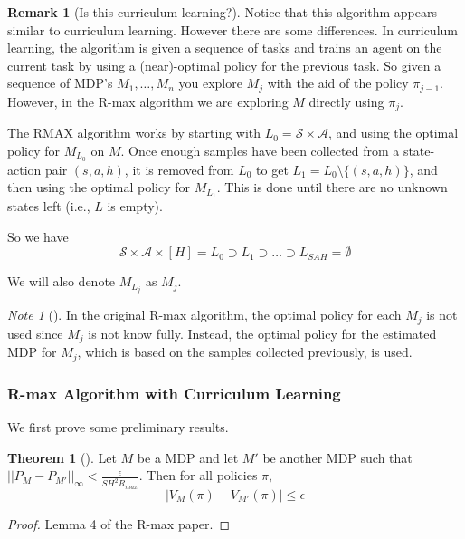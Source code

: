 \documentclass[12pt, letterpaper]{article}
\theoremstyle{definition}
\newtheorem*{thm}{Theorem}
\newtheorem*{rmk}{Remark}
\theoremstyle{remark}
\newtheorem*{note}{Note}
\begin{document}
\begin{rmk}[Is this curriculum learning?]
    Notice that this algorithm appears similar to curriculum learning. However there are some differences. In curriculum learning, the algorithm is given a sequence of tasks and trains an agent on the current task by using a (near)-optimal policy for the previous task. So given a sequence of MDP's \(M_1, \ldots, M_n\) you explore \(M_j\) with the aid of the policy \(\pi_{j-1}\). However, in the R-max algorithm we are exploring \(M\) directly using \(\pi_j\).
\end{rmk}

The RMAX algorithm works by starting with \(L_0 = \mathcal{S} \times \mathcal{A}\), and using the optimal policy for \(M_{L_0}\) on \(M\). Once enough samples have been collected from a state-action pair \((s, a, h)\), it is removed from \(L_0\) to get \(L_1 = L_0 \setminus \{(s, a, h)\}\), and then using the optimal policy for \(M_{L_1}\). This is done until there are no unknown states left (i.e., \(L\) is empty).

So we have
\[\mathcal{S} \times \mathcal{A} \times [H] = L_0 \supset L_1 \supset \ldots \supset L_{SAH} = \emptyset\]

We will also denote \(M_{L_j}\) as \(M_j\).

\begin{note}[]
    \color{red}
    In the original R-max algorithm, the optimal policy for each \(M_j\) is not used since \(M_j\) is not know fully. Instead, the optimal policy for the estimated MDP for \(M_j\), which is based on the samples collected previously, is used.
\end{note}

\subsubsection{R-max Algorithm with Curriculum Learning}

We first prove some preliminary results.

\begin{thm}[]
    Let \(M\) be a MDP and let \(M'\) be another MDP such that \(||P_{M} - P_{M'}||_{\infty} < \frac{\epsilon}{SH^2R_{max}}\). Then for all policies \(\pi\),
    \[|V_{M}(\pi) - V_{M'}(\pi)| \leq \epsilon\]
\end{thm}

\begin{proof}[Proof]
    Lemma 4 of the R-max paper.
\end{proof}
\end{document}
